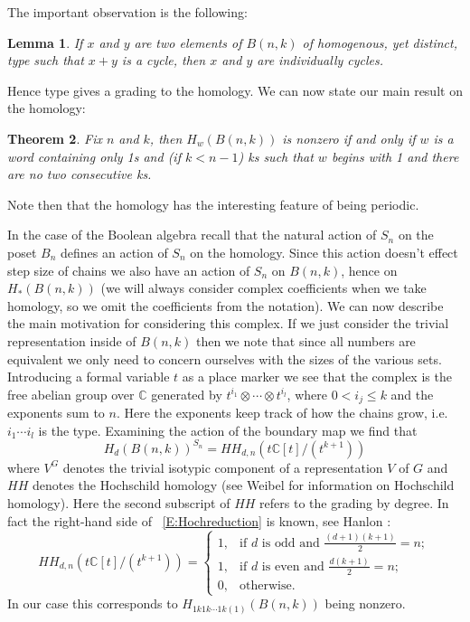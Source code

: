\documentclass{amsart}
\newtheorem{theorem}{Theorem}[section]
\newtheorem{lemma}[theorem]{Lemma}
\newcommand{\C}{\mathbb{C}}
\begin{document}
The important observation is the following: 
\begin{lemma} \label{L:grading} If $x$ and $y$ are two elements of $B(n, k)$ of homogenous, yet distinct, type such that
$x+y$ is a cycle, then $x$ and $y$ are individually cycles.
\end{lemma}
Hence type gives a grading to the homology. We can now state our main result on the homology:
\begin{theorem}\label{T:Main}
 Fix $n$ and $k$, then $H_w(B(n,k))$ is nonzero if and only if $w$ is a word containing only 1s and (if $k <n-1$) ks such that
 $w$ begins with 1 and there are no two consecutive ks.
\end{theorem} 
Note then that the homology has the interesting feature of being periodic. 

In the case of the Boolean algebra recall that
the natural action of $S_n$ on the poset $B_n$ defines an action of $S_n$ on the homology. Since this action doesn't 
effect step size of chains we also have an action of $S_n$ on $B(n, k)$, hence on $H_*(B(n, k))$ (we will always consider
complex coefficients when we take homology, so we omit the coefficients from the notation). We can now describe the
main motivation for considering this complex. If we just consider the trivial representation inside of $B(n, k)$ then we
note that since all numbers are equivalent we only need to concern ourselves with the sizes of the various sets. 
Introducing a formal variable $t$ as a place marker we see that the complex is the free abelian group over $\C$ generated
by $t^{i_1}\otimes \cdots \otimes t^{i_l}$, where $0 <i_j \le k$ and the exponents sum to $n$.
 Here the exponents keep track of how the chains grow, 
i.e. $i_1 \cdots i_l$ is the type. Examining the action of the boundary map we find that
\begin{equation} \label{E:Hochreduction}
  H_d(B(n, k))^{S_n} = HH_{d, n}(t\C[t]/(t^{k+1}))
\end{equation}
where $V^G$  denotes the trivial isotypic component of a representation $V$ of $G$ and $HH$ denotes the Hochschild 
homology (see Weibel \cite{Weibel} for information on Hochschild homology). Here the second 
subscript of $HH$ refers to the grading by degree. In fact the right-hand side of ~\ref{E:Hochreduction} is known, see 
Hanlon \cite{HanlonMac}:
\begin{equation} \label{E:HH}
  HH_{d, n}(t\C[t]/(t^{k+1})) = 
  \begin{cases} 
   1, &\text{if $d$ is odd and $\frac{(d+1)(k+1)}{2} = n;$}\\
   1, &\text{if $d$ is even and $\frac{d(k+1)}{2} = n;$}\\
   0, &\text{otherwise.}
  \end{cases}
\end{equation}
In our case this corresponds to $H_{1k1k\cdots1k(1)}(B(n, k))$ being nonzero.
\end{document}
